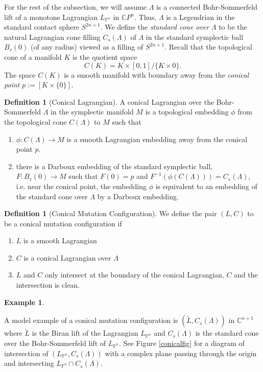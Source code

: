 \documentclass[11pt, oneside,dvipsnames]{amsart}
\renewcommand{\to}{\rightarrow}
\newcommand{\inv}{^{-1}}
\newcommand{\wt}{\widetilde}
\renewcommand{\to}{\rightarrow}
\newcommand{\<}{\langle}
\renewcommand{\>}{\rangle}
\newcommand{\bC}{\mathbb{C}}
\newcommand{\bP}{\mathbb{P}}
\renewcommand{\to}{\rightarrow}
\theoremstyle{definition}
\theoremstyle{definition}
\newtheorem{defn}[Theorem]{Definition}
\newtheorem{example}[Theorem]{Example}
\numberwithin{equation}{subsection}
\begin{document}
For the rest of the subsection,   we will assume $\Lambda$ is a connected Bohr-Sommerfeld lift of a monotone Lagrangian $L_{\bP^n}$ in $\bC P^n$. Thus, $\Lambda$ is a Legendrian in the standard contact sphere $S^{2n+1}$. We define the \textit{standard cone over} $\Lambda$ to be the natural Lagrangian cone filling $C_s(\Lambda)$ of $\Lambda$ in the standard symplectic ball $B_r(0)$ (of any radius) viewed as a filling of $S^{2n+1}$. Recall that the topological cone of a manifold $K$ is the quotient space $$C(K) = K \times [0,1]/ \{ K \times 0\}.$$ The space $C(K)$ is a smooth manifold with boundary away from the \textit{conical point } $p:=[ K \times \{0\}]$.



\begin{defn}[Conical Lagrangian]
    A conical Lagrangian over the Bohr-Sommerfeld $\Lambda$ in the symplectic manifold $M$ is a topological embedding $\phi$ from the topological cone $C(\Lambda)$ to $M$ such that 
    \begin{enumerate}
        \item  $\phi: C(\Lambda) \to M$ is a smooth Lagrangian embedding away from the conical point $p$.
        \item  there is a Darboux embedding of the standard symplectic ball, $F: B_r(0) \to M $ such that $F(0) = p$ and $F\inv (\phi (C(\Lambda)) ) = C_s(\Lambda)$, i.e. near the conical point, the embedding $\phi$ is equivalent to an embedding of the standard cone over $\Lambda$ by a Darboux embedding.
    \end{enumerate}
\end{defn}

\begin{defn}[Conical Mutation Configuration]
    We define the pair $(L,C)$ to be a conical mutation configuration if \begin{enumerate}
        \item $L$ is a smooth Lagrangian 
        \item $C$ is a conical Lagrangian over $\Lambda$
        \item $L$ and $C$ only intersect at the boundary of the conical Lagrangian, $C$ and the intersection is clean.
    \end{enumerate}
\end{defn}

\begin{example}\label{modelcone}
    
A model example of a conical mutation configuration is $ (\wt L, C_s(\Lambda))$ in $\bC^{n+1}$ where $\wt L$ is the Biran lift of the Lagrangian $L_{\bP^n}$ and $C_s(\Lambda)$ is the standard cone over the Bohr-Sommerfeld lift of $L_{\bP^n}$.  See Figure \ref{conicalfig} for a diagram of intersection of $(L_{\bP^n},C_s(\Lambda))$ with a complex plane passing through the origin and intersecting $L_{\bP^n}\cap C_s(\Lambda).$
\end{example}
\end{document}
